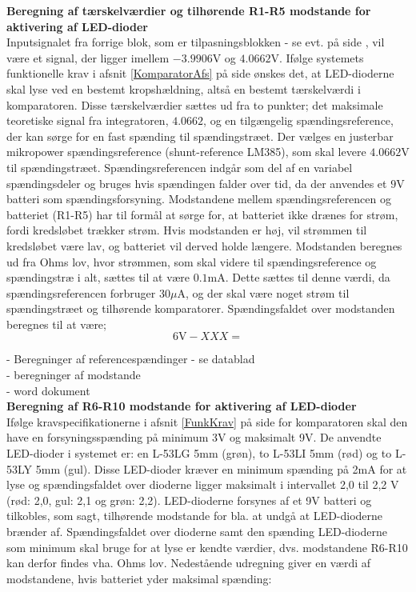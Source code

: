 \noindent\textbf{Beregning af tærskelværdier og tilhørende R1-R5 modstande for aktivering af LED-dioder} \\
Inputsignalet fra forrige blok, som er tilpasningsblokken - se evt.  på side \pageref{kravblok}, vil være et signal, der ligger imellem $−3.9906$V og $4.0662$V. Ifølge systemets funktionelle krav i afsnit \ref{KomparatorAfs} på side \pageref{KomparatorAfs} ønskes det, at LED-dioderne skal lyse ved en bestemt kropshældning, altså en bestemt tærskelværdi i komparatoren. Disse tærskelværdier sættes ud fra to punkter; det maksimale teoretiske signal fra integratoren, $4.0662$, og en tilgængelig spændingsreference, der kan sørge for en fast spænding til spændingstræet. Der vælges en justerbar mikropower spændingsreference (shunt-reference LM385), som skal levere $4.0662$V til spændingstræet. Spændingsreferencen indgår som del af en variabel spændingsdeler og bruges hvis spændingen falder over tid, da der anvendes et $9$V batteri som spændingsforsyning. Modstandene mellem spændingsreferencen og batteriet (R1-R5) har til formål at sørge for, at batteriet ikke drænes for strøm, fordi kredsløbet trækker strøm. Hvis modstanden er høj, vil strømmen til kredsløbet være lav, og batteriet vil derved holde længere. Modstanden beregnes ud fra Ohms lov, hvor strømmen, som skal videre til spændingsreference og spændingstræ i alt, sættes til at være $0.1$mA. Dette sættes til denne værdi, da spændingsreferencen forbruger $30\mu$A, og der skal være noget strøm til spændingstræet og tilhørende komparatorer. Spændingsfaldet over modstanden beregnes til at være;
\begin{equation}
6\text{V} - XXX  =   
\end{equation}

- Beregninger af referencespændinger - se datablad \\
- beregninger af modstande \\
- word dokument \\

\noindent\textbf{Beregning af R6-R10 modstande for aktivering af LED-dioder} \\
Ifølge kravspecifikationerne i afsnit \ref{FunkKrav}  på side \pageref{FunkKrav} for komparatoren skal den have en forsyningsspænding på minimum 3V og maksimalt 9V. De anvendte LED-dioder i systemet er: en L-53LG 5mm (grøn), to L-53LI 5mm (rød) og to L-53LY 5mm (gul). Disse LED-dioder kræver en minimum spænding på 2mA for at lyse og spændingsfaldet over dioderne ligger maksimalt i intervallet 2,0 til 2,2 V (rød: 2,0, gul: 2,1 og grøn: 2,2). LED-dioderne forsynes af et 9V batteri og tilkobles, som sagt, tilhørende modstande for bla. at undgå at LED-dioderne brænder af. Spændingsfaldet over dioderne samt den spænding LED-dioderne som minimum skal bruge for at lyse er kendte værdier, dvs. modstandene R6-R10 kan derfor findes vha. Ohms lov. Nedestående udregning giver en værdi af modstandene, hvis batteriet yder maksimal spænding: \\

